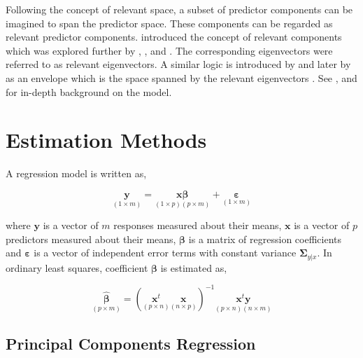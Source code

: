\documentclass[12pt,3p,authoryear]{elsarticle}
\begin{document}
Following the concept of relevant space, a subset of predictor
components can be imagined to span the predictor space. These components
can be regarded as relevant predictor components. \citet{Naes1985}
introduced the concept of relevant components which was explored further
by \citet{helland1990partial}, \citet{naes1993relevant},
\citet{Helland1994b} and \citet{Helland2000}. The corresponding
eigenvectors were referred to as relevant eigenvectors. A similar logic
is introduced by \citet{cook2010envelope} and later by
\citet{cook2013envelopes} as an envelope which is the space spanned by
the relevant eigenvectors \citep[, p.101]{cook2018envelope}. See
\citet{Rimal2018}, \citet{saebo2015simrel} and \citet{rimal2019pred} for
in-depth background on the model.

\section{Estimation Methods}\label{estimation-methods}

A regression model is written as,

\begin{equation}
\underset{(1\times m)}{\mathbf{y}} =
  \underset{(1\times p)(p\times m)}
    {\mathbf{x}\boldsymbol{\beta}} +
  \underset{(1 \times m)}{\boldsymbol{\varepsilon}}
\label{eq:reg-model}
\end{equation}

where \(\mathbf{y}\) is a vector of \(m\) responses measured about their
means, \(\mathbf{x}\) is a vector of \(p\) predictors measured about
their means, \(\boldsymbol{\beta}\) is a matrix of regression
coefficients and \(\boldsymbol{\varepsilon}\) is a vector of independent
error terms with constant variance \(\boldsymbol{\Sigma}_{y|x}\). In
ordinary least squares, coefficient \(\boldsymbol{\beta}\) is estimated
as,

\begin{equation}
\underset{(p\times m)}{\boldsymbol{\hat{\beta}}} =
  \left(\underset{(p\times n)}{\mathbf{x}^t}
  \underset{(n\times p)}{\mathbf{x}}\right)^{-1}
  \underset{(p \times n)(n \times m)}{\mathbf{x}^t\mathbf{y}}
\label{eq:reg-beta}
\end{equation}

\subsection{Principal Components
Regression}\label{principal-components-regression}
\end{document}
